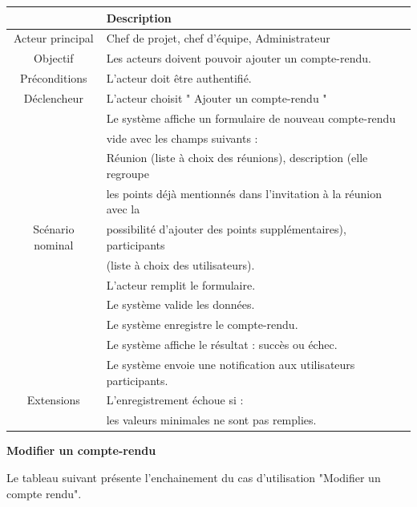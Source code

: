 \begin{center}
\begin{tabular}{|c|l|}
\hline 
&\textbf { Description }\\\hline 
    Acteur principal & Chef de projet, chef d’équipe, Administrateur \\\hline 
    Objectif&Les acteurs doivent pouvoir ajouter un compte-rendu.\\\hline
    Préconditions&L’acteur doit être authentifié.  \\\hline 
    Déclencheur&L’acteur choisit " Ajouter un compte-rendu "\\\hline
    &Le système affiche un formulaire de nouveau compte-rendu   \\
    &vide avec les champs suivants :    \\
    &Réunion (liste à choix des réunions), description (elle regroupe  \\
    &les points déjà mentionnés dans l’invitation à la réunion avec la      \\
    Scénario nominal& possibilité d’ajouter des points supplémentaires), participants    \\&(liste à choix des utilisateurs).\\&L’acteur remplit le formulaire. \\
    &Le système valide les données. \\&Le système enregistre le compte-rendu.  \\&Le système affiche le résultat : succès ou échec.  \\&Le système envoie une notification aux utilisateurs participants.\\\hline
    Extensions&   L’enregistrement échoue si :\\&les valeurs minimales ne sont pas remplies.\\\hline
\end{tabular}
\label{desc_gerer_cmpterendu}
\end{center}
\newpage
\par \textbf{  	Modifier un compte-rendu	}
\par Le tableau suivant présente l’enchainement du cas d’utilisation "Modifier un compte rendu".

